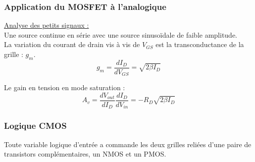\documentclass[../main.tex]{subfiles}
\begin{document}
\subsubsection{Application du MOSFET à l'analogique}

\quad \underline{Analyse des petits signaux :}\\
Une source continue en série avec une source sinusoïdale de faible amplitude. \\
La variation du courant de drain vis à vis de $V_{GS}$ est la transconductance de la grille : $g_m$.\\
\begin{equation}
    g_m = \frac{dI_D}{dV_{GS}} = \sqrt{2\beta I_D}
\end{equation}

Le gain en tension en mode saturation : \begin{equation}
    A_v = \frac{dV_{out}}{dI_D} \frac{dI_D}{dV_{in}} = -R_D \sqrt{2\beta I_D}
\end{equation}

\subsubsection{Logique CMOS}
Toute variable logique d'entrée a commande les deux grilles reliées d'une paire de transistors complémentaires, un NMOS et un PMOS.\\
\end{document}
